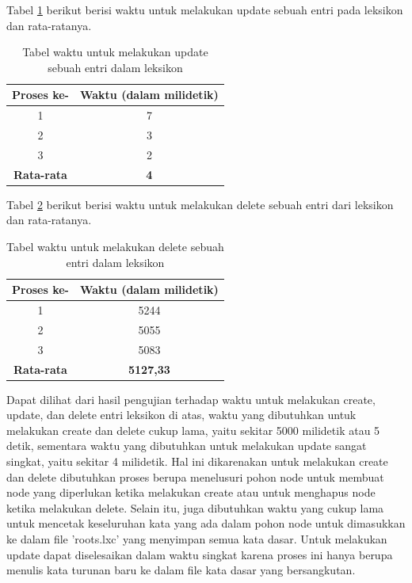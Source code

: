 Tabel \ref{tabel-waktu-update} berikut berisi waktu untuk melakukan update sebuah entri pada leksikon dan rata-ratanya.

\begin{table}[H]
\centering
\begin{tabular}{|c|c|}
\hline
\textbf{Proses ke-} & \textbf{Waktu} (dalam milidetik) \\
\hline
1&7\\
2&3\\
3&2\\
\hline
\textbf{Rata-rata} & \textbf{4}\\
\hline
\end{tabular}
\caption{Tabel waktu untuk melakukan update sebuah entri dalam leksikon} 
\label{tabel-waktu-update}
\end{table}

Tabel \ref{tabel-waktu-delete} berikut berisi waktu untuk melakukan delete sebuah entri dari leksikon dan rata-ratanya.

\begin{table}[H]
\centering
\begin{tabular}{|c|c|}
\hline
\textbf{Proses ke-} & \textbf{Waktu} (dalam milidetik) \\
\hline
1&5244\\
2&5055\\
3&5083\\
\hline
\textbf{Rata-rata} & \textbf{5127,33}\\
\hline
\end{tabular}
\caption{Tabel waktu untuk melakukan delete sebuah entri dalam leksikon} 
\label{tabel-waktu-delete}
\end{table}

Dapat dilihat dari hasil pengujian terhadap waktu untuk melakukan create, update, dan delete entri leksikon di atas, waktu yang dibutuhkan untuk melakukan create dan delete cukup lama, yaitu sekitar 5000 milidetik atau 5 detik, sementara waktu yang dibutuhkan untuk melakukan update sangat singkat, yaitu sekitar 4 milidetik. Hal ini dikarenakan untuk melakukan create dan delete dibutuhkan proses berupa menelusuri pohon node untuk membuat node yang diperlukan ketika melakukan create atau untuk menghapus node ketika melakukan delete. Selain itu, juga dibutuhkan waktu yang cukup lama untuk mencetak keseluruhan kata yang ada dalam pohon node untuk dimasukkan ke dalam file 'roots.lxc' yang menyimpan semua kata dasar. Untuk melakukan update dapat diselesaikan dalam waktu singkat karena proses ini hanya berupa menulis kata turunan baru ke dalam file kata dasar yang bersangkutan.